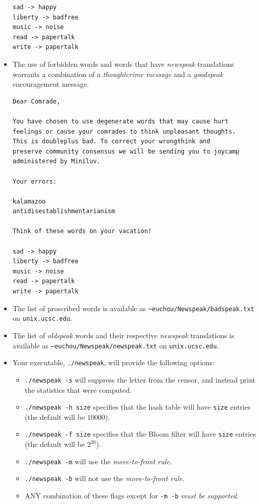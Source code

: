 \documentclass{article}
\begin{document}
\begin{itemize}
\begin{lstlisting}[title=Example goodspeak message.]
sad -> happy
liberty -> badfree
music -> noise
read -> papertalk
write -> papertalk
\end{lstlisting}
\item The use of forbidden words and words that have \emph{newspeak}
    translations warrants a combination of a \emph{thoughtcrime message} and a
    \emph{goodspeak} encouragement message.
\begin{lstlisting}[title=Example thoughtcrime/goodspeak message.]
Dear Comrade,

You have chosen to use degenerate words that may cause hurt
feelings or cause your comrades to think unpleasant thoughts.
This is doubleplus bad. To correct your wrongthink and
preserve community consensus we will be sending you to joycamp
administered by Miniluv.

Your errors:

kalamazoo
antidisestablishmentarianism

Think of these words on your vacation!

sad -> happy
liberty -> badfree
music -> noise
read -> papertalk
write -> papertalk
\end{lstlisting}
\item The list of proscribed words is available as
    \verb+~euchou/Newspeak/badspeak.txt+
    on \texttt{unix.ucsc.edu}.
\item The list of \emph{oldspeak} words and their respective \emph{newspeak}
    translations is available as \verb+~euchou/Newspeak/newspeak.txt+ on
    \texttt{unix.ucsc.edu}.
\item Your executable, \texttt{./newspeak}, will provide the following options:
        \begin{itemize}
        \item \texttt{./newspeak -s} will suppress the letter from the censor,
            and instead print the statistics that were computed.
        \item \texttt{./newspeak -h size} specifies that the hash table will
            have \texttt{size} entries (the default will be $10000$).
        \item \texttt{./newspeak -f size} specifies that the Bloom filter will
            have \texttt{size} entries (the default will be $2^{20}$).
        \item \texttt{./newspeak -m} will use the \emph{move-to-front rule}.
        \item \texttt{./newspeak -b} will not use the \emph{move-to-front rule}.
        \item ANY combination of these flags except for \texttt{-m -b}
            \emph{must be supported}.
        \end{itemize}
\end{itemize}
\end{document}
